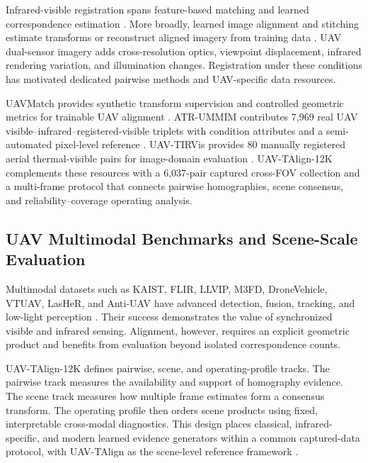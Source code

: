 Infrared-visible registration spans feature-based matching and learned correspondence estimation
\cite{li2020rift,li2023rift2,tuzcuoglu2024xoftr,ren2025minima}. More broadly, learned image alignment
and stitching estimate transforms or reconstruct aligned imagery from training data
\cite{chang2017clkn,nie2021udis}. UAV dual-sensor imagery adds cross-resolution optics,
viewpoint displacement, infrared rendering variation, and illumination changes. Registration under
these conditions has motivated dedicated pairwise methods and UAV-specific data resources.

UAVMatch provides synthetic transform supervision and controlled geometric metrics for trainable
UAV alignment \cite{gao2025uavmatch}. ATR-UMMIM contributes 7,969 real UAV
visible--infrared--registered-visible triplets with condition attributes and a semi-automated
pixel-level reference \cite{bin2025atrummim}. UAV-TIRVis provides 80 manually registered aerial
thermal-visible pairs for image-domain evaluation \cite{vasile2025uavtirvis}. UAV-TAlign-12K
complements these resources with a 6,037-pair captured cross-FOV collection and a multi-frame
protocol that connects pairwise homographies, scene consensus, and reliability--coverage operating
analysis.

\subsection{UAV Multimodal Benchmarks and Scene-Scale Evaluation}

Multimodal datasets such as KAIST, FLIR, LLVIP, M3FD, DroneVehicle, VTUAV, LasHeR, and Anti-UAV
have advanced detection, fusion, tracking, and low-light perception
\cite{hwang2015kaist,flir2018thermal,jia2021llvip,liu2022tardal,sun2022dronevehicle,zhang2022vtuav,li2022lasher,jiang2023antiuav}.
Their success demonstrates the value of synchronized visible and infrared sensing. Alignment,
however, requires an explicit geometric product and benefits from evaluation beyond isolated
correspondence counts.

UAV-TAlign-12K defines pairwise, scene, and operating-profile tracks. The
pairwise track measures the availability and support of homography evidence. The scene track
measures how multiple frame estimates form a consensus transform. The operating profile then
orders scene products using fixed, interpretable cross-modal diagnostics. This design places
classical, infrared-specific, and modern learned evidence generators within a common captured-data
protocol, with UAV-TAlign as the scene-level reference framework
\cite{ma2021survey,liao2024survey}.
